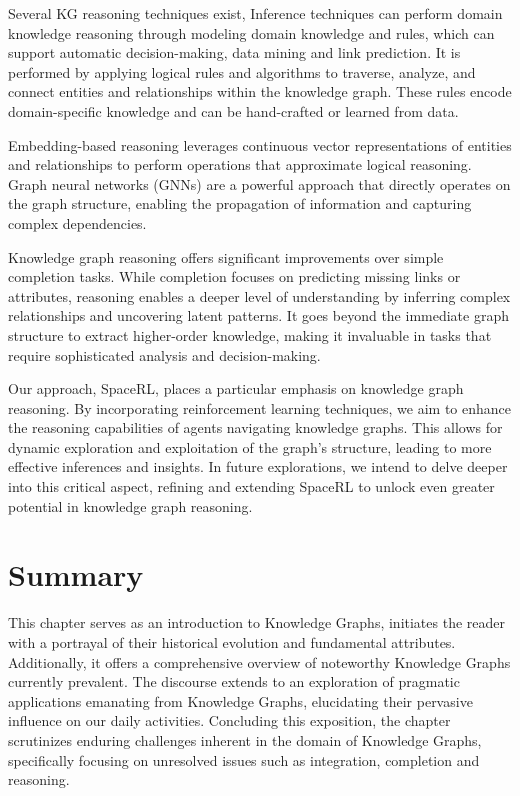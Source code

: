 

Several KG reasoning techniques exist, Inference techniques can perform domain knowledge reasoning through modeling domain knowledge and rules, which can support automatic decision-making, data mining and link prediction. It is performed by applying logical rules and algorithms to traverse, analyze, and connect entities and relationships within the knowledge graph. These rules encode domain-specific knowledge and can be hand-crafted or learned from data.

Embedding-based reasoning leverages continuous vector representations of entities and relationships to perform operations that approximate logical reasoning. Graph neural networks (GNNs) \cite{sola2022} are a powerful approach that directly operates on the graph structure, enabling the propagation of information and capturing complex dependencies.


Knowledge graph reasoning offers significant improvements over simple completion tasks. While completion focuses on predicting missing links or attributes, reasoning enables a deeper level of understanding by inferring complex relationships and uncovering latent patterns. It goes beyond the immediate graph structure to extract higher-order knowledge, making it invaluable in tasks that require sophisticated analysis and decision-making.

Our approach, SpaceRL, places a particular emphasis on knowledge graph reasoning. By incorporating reinforcement learning techniques, we aim to enhance the reasoning capabilities of agents navigating knowledge graphs. This allows for dynamic exploration and exploitation of the graph's structure, leading to more effective inferences and insights. In future explorations, we intend to delve deeper into this critical aspect, refining and extending SpaceRL to unlock even greater potential in knowledge graph reasoning.

\section{Summary}\label{sec:kgs-summary}
This chapter serves as an introduction to Knowledge Graphs, initiates the reader with a portrayal of their historical evolution and fundamental attributes. Additionally, it offers a comprehensive overview of noteworthy Knowledge Graphs currently prevalent. The discourse extends to an exploration of pragmatic applications emanating from Knowledge Graphs, elucidating their pervasive influence on our daily activities. Concluding this exposition, the chapter scrutinizes enduring challenges inherent in the domain of Knowledge Graphs, specifically focusing on unresolved issues such as integration, completion and reasoning.